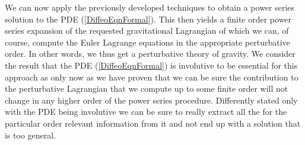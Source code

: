 \documentclass[a4paper,12pt, DIV=14, BCOR=5mm, twoside, headsepline, numbers=noenddot]{scrbook}
\begin{document}
We can now apply the previously developed techniques to obtain a power series solution to the PDE (\ref{DiffeoEqnFormal}). This then yields a finite order power series expansion of the requested gravitational Lagrangian of which we can, of course, compute the Euler Lagrange equations in the appropriate perturbative order. In other words, we thus get a perturbative theory of gravity. We consider the result that the PDE (\ref{DiffeoEqnFormal}) is involutive to be essential for this approach as only now as we have proven that we can be sure the contribution to the perturbative Lagrangian that we compute up to some finite order will not change in any higher order of the power series procedure. Differently stated only with the PDE being involutive we can be sure to really extract all the for the particular order relevant information from it and not end up with a solution that is too general. 
\end{document}
